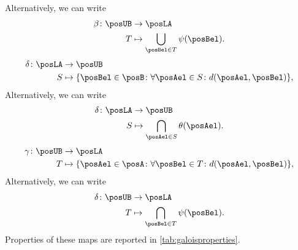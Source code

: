 %
\noindent Alternatively, we can write
\begin{equation}
    \begin{aligned}
        \beta \colon \posUB & \to \posLA                                    \\
        T                   & \mapsto \bigcup_{\posBel\in T} \psi(\posBel).
    \end{aligned}
\end{equation}
%
\begin{equation}
    \label{eq:galoisdelta}
    \begin{aligned}
        \delta \colon \posLA & \to \posUB                                                                           \\
        S                    & \mapsto \{\posBel\in \posB \colon \forall {\posAel\in S}\colon d(\posAel,\posBel)\},
    \end{aligned}
\end{equation}
Alternatively, we can write
\begin{equation}
    \begin{aligned}
        \delta\colon \posLA & \to \posUB                                     \\
        S                   & \mapsto \bigcap_{\posAel\in S}\theta(\posAel).
    \end{aligned}
\end{equation}
%
\begin{equation}
    \label{eq:galoisgamma}
    \begin{aligned}
        \gamma \colon \posUB & \to \posLA                                                                           \\
        T                    & \mapsto \{\posAel\in \posA \colon \forall {\posBel\in T}\colon d(\posAel,\posBel)\},
    \end{aligned}
\end{equation}
Alternatively, we can write
\begin{equation}
    \begin{aligned}
        \delta\colon \posUB & \to \posLA                                   \\
        T                   & \mapsto \bigcap_{\posBel\in T}\psi(\posBel).
    \end{aligned}
\end{equation}
%
Properties of these maps are reported in \cref{tab:galoisproperties}.

